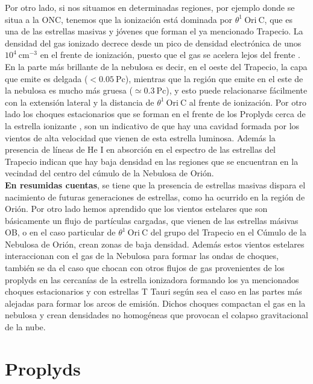 Por otro lado, si nos situamos en determinadas regiones, por ejemplo donde se situa a la ONC, tenemos que la ionización está dominada por  \(\theta^1\ \text{Ori}\ \text{C}\), que es una de las estrellas masivas y jóvenes que forman el ya mencionado Trapecio. La densidad del gas ionizado decrece desde un pico de densidad electrónica de unos  \(10^{4}~\text{cm}^{-3}\) en el frente de ionización, puesto que el gas se acelera lejos del frente \citep{Henney:2005a}. En la parte más brillante de la nebulosa es decir, en el oeste del Trapecio, la capa que emite es delgada (\(< 0.05 ~\text{Pc}\)), mientras que la región que emite en el este de la nebulosa es mucho más gruesa (\(\simeq 0.3~\text{Pc}\)), y esto puede relacionarse fácilmente con la extensión lateral y la distancia de  \(\theta^1\ \text{Ori}\ \text{C}\) al frente de ionización. Por otro lado los choques estacionarios que se forman en el frente de los Proplyds cerca de la estrella ionizante \citep{Bally:2000a}, son un indicativo de que hay una cavidad formada por los vientos de alta velocidad que vienen de esta estrella luminosa. Además  la presencia de líneas de He I en absorción en el espectro de las estrellas del Trapecio \citep{Odell:1993, Baldwin:1991} indican que hay baja densidad en las regiones que se encuentran en la vecindad del centro del cúmulo de la Nebulosa de Orión. \\

\textbf{En resumidas cuentas}, se tiene que la presencia de estrellas masivas dispara el nacimiento de futuras generaciones de estrellas, como ha ocurrido en la región de Orión. Por otro lado hemos aprendido que los vientos estelares que son básicamente un flujo de partículas cargadas, que vienen de las estrellas másivas OB, o en el caso particular de \(\theta^1\ \text{Ori}\ \text{C}\) del grupo del Trapecio en el Cúmulo de la Nebulosa de Orión, crean zonas de baja densidad. Además estos vientos estelares interaccionan con el gas de la Nebulosa para formar las ondas de choques, también se da el caso que chocan con otros flujos de gas provenientes de los proplyds en las cercanías de la estrella ionizadora formando los ya mencionados choques estacionarios y con estrellas T Tauri según sea el caso en las partes más alejadas para formar los arcos de emisión. Dichos choques compactan el gas en la nebulosa y crean densidades no homogéneas que provocan el colapso gravitacional de la nube.\\

\section{Proplyds}
\label{sec:proplyds}

